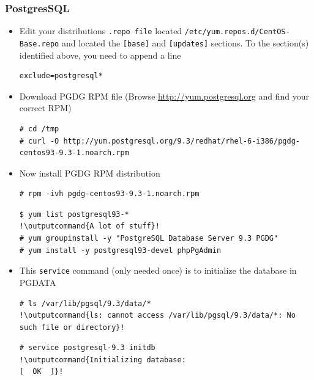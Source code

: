 \documentclass{beamer}
\newcommand{\outputcommand}[1]{\color{darkgreen}{#1}}
\begin{document}
\begin{frame}
\frametitle{PostgresSQL}
\begin{itemize}
\item Edit your distributions \texttt{.repo file} located \texttt{/etc/yum.repos.d/CentOS-Base.repo} and located the \texttt{[base]} and \texttt{[updates]} sections.
To the section(s) identified above, you need to append a line

\lstset{language=shell, escapechar=!,numbers=left}
\begin{lstlisting}[escapechar=!]
exclude=postgresql*
\end{lstlisting}

\item Download PGDG RPM file (Browse \url{http://yum.postgresql.org} and find your correct RPM)

\lstset{language=shell, escapechar=!}
\begin{lstlisting}[escapechar=!]
# cd /tmp
# curl -O http://yum.postgresql.org/9.3/redhat/rhel-6-i386/pgdg-centos93-9.3-1.noarch.rpm
\end{lstlisting}

\item Now install PGDG RPM  distribution

\begin{lstlisting}[escapechar=!]
# rpm -ivh pgdg-centos93-9.3-1.noarch.rpm
\end{lstlisting}

\lstset{language=shell, escapechar=!}
\begin{lstlisting}[escapechar=!]
$ yum list postgresql93-*
!\outputcommand{A lot of stuff}!
# yum groupinstall -y "PostgreSQL Database Server 9.3 PGDG"
# yum install -y postgresql93-devel phpPgAdmin
\end{lstlisting}

\item This \texttt{service} command (only needed once) is to initialize the database in PGDATA
 
\lstset{language=shell, escapechar=!}
\begin{lstlisting}[escapechar=!]
# ls /var/lib/pgsql/9.3/data/*
!\outputcommand{ls: cannot access /var/lib/pgsql/9.3/data/*: No such file or directory}!
\end{lstlisting}


\lstset{language=shell, escapechar=!}
\begin{lstlisting}[escapechar=!]
# service postgresql-9.3 initdb
!\outputcommand{Initializing database:                                     [  OK  ]}!
\end{lstlisting}


\end{itemize}
\end{frame}
\end{document}

